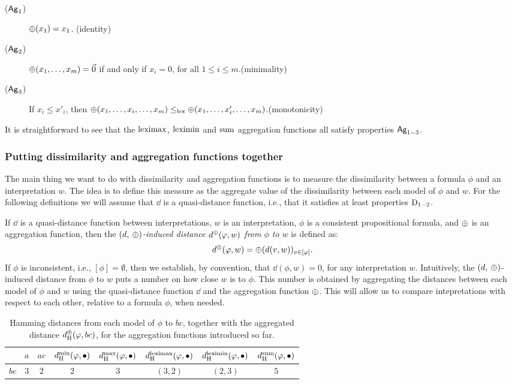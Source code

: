 \begin{description}
	\item[($\mathsf{Ag}_{{1}}$)] ${\operatorname{\oplus}}(x_1) = x_1$. \hfill(identity)
	\item[($\mathsf{Ag}_{{2}}$)] ${\operatorname{\oplus}}(x_1,\dots,x_m) = \vec{0}$ if and only if $x_i = 0$, for all $1\le i\le m$.\hfill(minimality)
	\item[($\mathsf{Ag}_{{3}}$)] If $x_i\le x'_i$, 
		then ${\operatorname{\oplus}}(x_1,\dots,x_i,\dots,x_m)\le_{{\operatorname{lex}}}{\operatorname{\oplus}}(x_1,\dots,x'_i,\dots,x_m)$.\hfill(monotonicity) 
\end{description}

It is straightforward to see that the ${\operatorname{leximax}}$, ${\operatorname{leximin}}$ and ${\operatorname{sum}}$ aggregation 
functions all satisfy properties $\mathsf{Ag}_{{1-3}}$.



\subsubsection{Putting dissimilarity and aggregation functions together}
The main thing we want to do with dissimilarity and aggregation functions 
is to measure the dissimilarity between a formula $\phi$ and an interpretation $w$.
The idea is to define this measure as the 
aggregate value of the dissimilarity between each model of $\phi$ and $w$.
For the following definitions we will assume that $\dd$ is a quasi-distance function,
i.e., that it satisfies at least properties $\mathrm{D}_{1-2}$.

If $\dd$ is a quasi-distance function between interpretations, 
$w$ is an interpretation,
$\phi$ is a consistent propositional formula, 
and ${\operatorname{\oplus}}$ is an aggregation function, 
then the \emph{$(d,\:{\operatorname{\oplus}})$-induced distance $d^{\operatorname{\oplus}}(\varphi,w)$ from $\phi$ to $w$} is defined as:
$$
	d^{\operatorname{\oplus}}(\varphi,w)={\operatorname{\oplus}}(d(v,w))_{v\in[\varphi]}.
$$
If $\phi$ is inconsistent, i.e., $[\phi]=\emptyset$, then we establish, by convention,
that $\dd(\phi,w)=0$, for any interpretation $w$.
Intuitively, the $(d,\:{\operatorname{\oplus}})$-induced distance from $\phi$ to $w$ 
puts a number on how close $w$ is to $\phi$.
This number is obtained by aggregating the distances 
between each model of $\phi$ and $w$
using the quasi-distance function $\dd$
and the aggregation function ${\operatorname{\oplus}}$.
This will allow us to compare intepretations with respect to each other,
relative to a formula $\phi$, when needed.

\begin{table}\centering
	\begin{tabular}{cccccccc}
		\toprule
		& $a$ & $ac$ & $d^{{\operatorname{min}}}_{{\operatorname{H}}}(\varphi,\bullet)$ & $d^{{\operatorname{max}}}_{{\operatorname{H}}}(\varphi,\bullet)$ & $d^{{\operatorname{leximax}}}_{{\operatorname{H}}}(\varphi,\bullet)$ &
		$d^{{\operatorname{leximin}}}_{{\operatorname{H}}}(\varphi,\bullet)$ & $d^{{\operatorname{sum}}}_{{\operatorname{H}}}(\varphi,\bullet)$\\
		\midrule
		$bc$ & $3$ & $2$ & $2$ & $3$ & $(3,2)$ & $(2,3)$ & $5$\\
		\bottomrule
	\end{tabular}
	\caption{
		Hamming distances from each model of $\phi$ to $bc$,
		together with the aggregated distance $d^{{\operatorname{\oplus}}}_{{\operatorname{H}}}(\varphi,bc)$,
		for the aggregation functions introduced so far.
	}
	\label{tab:2-aggregation}
\end{table}

